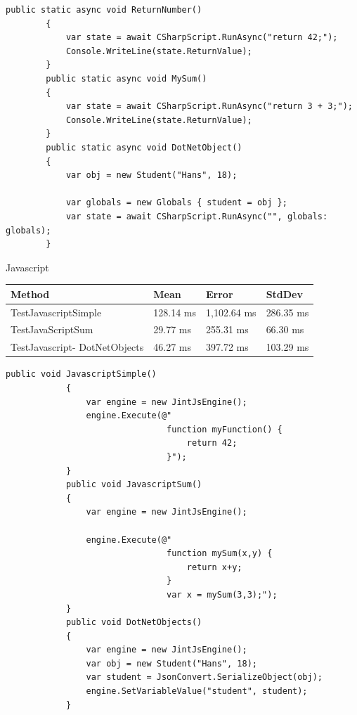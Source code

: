         \begin{lstlisting}[language={[Sharp]C}, caption=CsharpScriptingTestMethods, label=lst:imp:cscm]
            public static async void ReturnNumber()
        {
            var state = await CSharpScript.RunAsync("return 42;");
            Console.WriteLine(state.ReturnValue);
        }
        public static async void MySum()
        {
            var state = await CSharpScript.RunAsync("return 3 + 3;");
            Console.WriteLine(state.ReturnValue);
        }
        public static async void DotNetObject()
        {
            var obj = new Student("Hans", 18);

            var globals = new Globals { student = obj };
            var state = await CSharpScript.RunAsync("", globals: globals);
        }
        \end{lstlisting}
Javascript
     \begin{table}[H]
            \begin{tabular}{|p{3.5cm}|p{3cm}|p{3cm}|p{3cm}|}
            \hline
                Method & Mean & Error & StdDev \\ \hline
                TestJavascriptSimple & 128.14 ms & 1,102.64 ms & 286.35 ms  \\ \hline
                TestJavaScriptSum & 29.77 ms & 255.31 ms & 66.30 ms \\ \hline
                TestJavascript-
                DotNetObjects & 46.27 ms & 397.72 ms & 103.29 ms  \\ \hline
            \end{tabular}
        \end{table}

        \begin{lstlisting}[language={[Sharp]C}, caption=JavascriptTestMethods, label=lst:imp:jsm]
            public void JavascriptSimple()
            {
                var engine = new JintJsEngine();           
                engine.Execute(@"
                                function myFunction() {
                                    return 42;
                                }");           
            }
            public void JavascriptSum()
            {
                var engine = new JintJsEngine();
    
                engine.Execute(@"
                                function mySum(x,y) {
                                    return x+y;
                                }
                                var x = mySum(3,3);");
            }
            public void DotNetObjects()
            {
                var engine = new JintJsEngine();
                var obj = new Student("Hans", 18);
                var student = JsonConvert.SerializeObject(obj);
                engine.SetVariableValue("student", student);           
            }
        \end{lstlisting}
    


